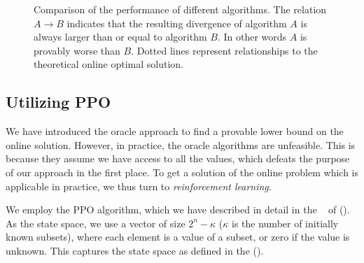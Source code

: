 \begin{figure}[t!]
	\centering
	\caption{Comparison of the performance of different algorithms.
  The relation $ A \to B $ indicates that the resulting divergence of algorithm $ A $ is always larger than or equal to algorithm $ B $.
  In other words $ A $ is provably worse than $ B $.
  Dotted lines represent relationships to the theoretical online optimal solution.
}
\end{figure}

\subsection{Utilizing PPO}
\label{sec:ppo}

We have introduced the oracle approach to find a provable lower bound on the online solution.
However, in practice, the oracle algorithms are unfeasible.
This is because they assume we have access to all the values, which defeats the purpose of our approach in the first place.
To get a solution of the online problem which is applicable in practice, we thus turn to \emph{reinforcement learning}.

We employ the PPO algorithm, which we have described in detail in the ~ of  ().
As the state space, we use a vector of size $ 2^n - \kappa $ ($ \kappa $ is the number of initially known subsets), where each element is a value of a subset, or zero if the value is unknown.
This captures the state space as defined in the  ().


